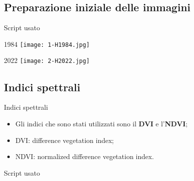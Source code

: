 \documentclass{beamer}
\begin{document}
\subsection{Preparazione iniziale delle immagini}

\begin{frame}{Script usato}
    \begin{tiny}
        
    \end{tiny}
\end{frame}

\begin{frame}{1984}
    \texttt{[image: 1-H1984.jpg]}
    \centering
\end{frame}

\begin{frame}{2022}
    \texttt{[image: 2-H2022.jpg]}
    \centering
\end{frame}


\subsection{Indici spettrali}

\begin{frame}{Indici spettrali}
    \begin{itemize}
        \item Gli indici che sono stati utilizzati sono il \textbf{DVI} e l'\textbf{NDVI};
        
        \bigskip
        
        \item \pause DVI:  difference vegetation index;
        
        \bigskip
        
        \item \pause NDVI:  normalized difference vegetation index.
    \end{itemize}
\end{frame}

\begin{frame}{Script usato}
    \begin{scriptsize}
    
    \end{scriptsize}
\end{frame}
\end{document}

